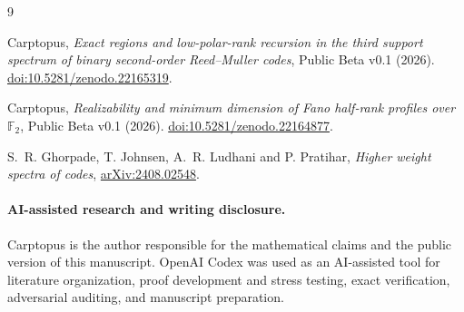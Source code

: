 \documentclass[11pt]{article}
\begin{document}
\begin{thebibliography}{9}
\footnotesize
\raggedright

Carptopus,
\emph{Exact regions and low-polar-rank recursion in the third support spectrum of binary
second-order Reed--Muller codes}, Public Beta v0.1 (2026).
\href{https://doi.org/10.5281/zenodo.22165319}{doi:10.5281/zenodo.22165319}.

Carptopus,
\emph{Realizability and minimum dimension of Fano half-rank profiles over $\mathbb F_2$},
Public Beta v0.1 (2026).
\href{https://doi.org/10.5281/zenodo.22164877}{doi:10.5281/zenodo.22164877}.

S.~R. Ghorpade, T. Johnsen, A.~R. Ludhani and P. Pratihar,
\emph{Higher weight spectra of codes},
\href{https://arxiv.org/abs/2408.02548}{arXiv:2408.02548}.

\end{thebibliography}

\paragraph{AI-assisted research and writing disclosure.}
Carptopus is the author responsible for the mathematical claims and the public version of this
manuscript. OpenAI Codex was used as an AI-assisted tool for literature organization, proof
development and stress testing, exact verification, adversarial auditing, and manuscript
preparation.
\end{document}
